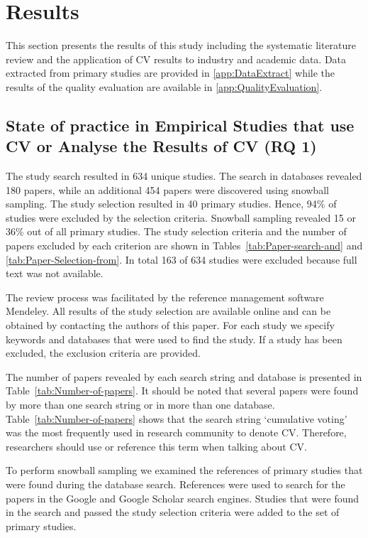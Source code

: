 \section{\label{results}Results}

This section presents the results of this study including the systematic literature review and the application of CV results to industry and academic data.
Data extracted from primary studies are provided in \ref{app:DataExtract} while the results of the quality evaluation are available in \ref{app:QualityEvaluation}.

\parskip -3pt
\subsection{State of practice in Empirical Studies that use CV or Analyse the Results of CV (RQ 1)\label{rq1}}

The study search resulted in 634 unique studies. The search in databases revealed 180 papers, while an additional 454 papers were discovered using snowball sampling.
The study selection resulted in 40 primary studies. Hence, 94\% of studies were excluded by the selection criteria.
Snowball sampling revealed 15 or 36\% out of all primary studies.
The study selection criteria and the number of papers excluded by each criterion are shown in Tables~\ref{tab:Paper-search-and} and \ref{tab:Paper-Selection-from}.
In total 163 of 634 studies were excluded because full text was not available.
\parskip 0pt

The review process was facilitated by the reference management software Mendeley.
All results of the study selection are available online and can be obtained by contacting the authors of this paper.
For each study we specify keywords and databases that were used to find the study.
If a study has been excluded, the exclusion criteria are provided.

The number of papers revealed by each search string and database is
presented in Table~\ref{tab:Number-of-papers}. It should be noted
that several papers were found by more than one search string or in
more than one database. Table~\ref{tab:Number-of-papers} shows that
the search string `cumulative voting' was the most frequently used
in research community to denote CV. Therefore, researchers should use 
or reference this term when talking about CV.

To perform snowball sampling we examined the references of primary studies that were found during the database search.
References were used to search for the papers in the Google and Google Scholar search engines.
Studies that were found in the search and passed the study selection criteria were added to the set of primary studies.

